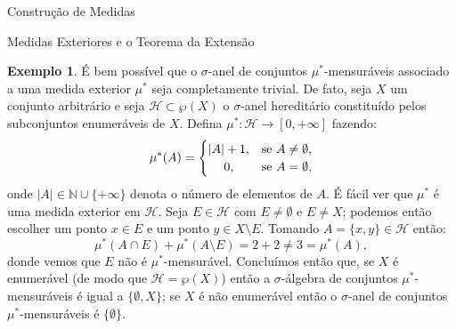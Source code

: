 \documentclass[oneside,final,11pt]{amsbook}
\newcommand{\N}{\mathds N}
\theoremstyle{remark}\newtheorem{exercise}{Exercício}[chapter]
\theoremstyle{remark}\newtheorem{*exercise}[exercise]{\hbox to 0pt{\hskip 0pt minus 1fil*}Exercício}
\theoremstyle{definition}\newtheorem{exdefin}{Definição}[chapter]
\theoremstyle{plain}\newtheorem{teo}{Teorema}[section]
\theoremstyle{plain}\newtheorem{lem}[teo]{Lema}
\theoremstyle{plain}\newtheorem{prop}[teo]{Proposição}
\theoremstyle{plain}\newtheorem{cor}[teo]{Corolário}
\theoremstyle{definition}\newtheorem{defin}[teo]{Definição}
\theoremstyle{remark}\newtheorem{rem}[teo]{Observação}
\theoremstyle{definition}\newtheorem{notation}[teo]{Notação}
\theoremstyle{definition}\newtheorem{convention}[teo]{Convenção}
\theoremstyle{definition}\newtheorem{example}[teo]{Exemplo}
\numberwithin{section}{chapter}
\numberwithin{equation}{section}
\begin{document}
\begin{chapter}{Construção de Medidas}
\begin{section}{Medidas Exteriores e o Teorema da Extensão}
\begin{example}
É bem possível que o $\sigma$-anel de conjuntos $\mu^*$-men\-su\-rá\-veis associado a uma medida
exterior $\mu^*$ seja completamente trivial. De fato, seja $X$ um conjunto arbitrário
e seja $\mathcal H\subset\wp(X)$ o $\sigma$-anel hereditário constituído pelos subconjuntos
enumeráveis de $X$. Defina $\mu^*:\mathcal H\to[0,+\infty]$ fazendo:
\[\mu^*(A)=\begin{cases}
\vert A\vert+1,&\text{se $A\ne\emptyset$},\\
\hfil0,&\text{se $A=\emptyset$},
\end{cases}\]
onde $\vert A\vert\in\N\cup\{+\infty\}$ denota o número de elementos de $A$. É fácil ver
que $\mu^*$ é uma medida exterior em $\mathcal H$. Seja $E\in\mathcal H$ com $E\ne\emptyset$
e $E\ne X$; podemos então escolher um ponto $x\in E$ e um ponto $y\in X\setminus E$.
Tomando $A=\{x,y\}\in\mathcal H$ então:
\[\mu^*(A\cap E)+\mu^*(A\setminus E)=2+2\ne3=\mu^*(A),\]
donde vemos que $E$ não é $\mu^*$-mensurável. Concluímos então que, se $X$ é enumerável
(de modo que $\mathcal H=\wp(X)$) então a $\sigma$-álgebra de conjuntos $\mu^*$-mensuráveis
é igual a $\{\emptyset,X\}$; se $X$ é não enumerável então o $\sigma$-anel de conjuntos
$\mu^*$-mensuráveis é $\{\emptyset\}$.
\end{example}


\end{section}
\end{chapter}
\end{document}
